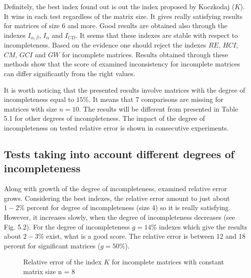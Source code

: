 Definitely, the best index found out is out the index proposed by Koczkodaj ($K$). It wins in each test regardless of the matrix size. It gives really satisfying results for matrices of size 6 and more. Good results are obtained also through the indexes $I_{\alpha,\beta}$, $I_{\alpha}$ and $I_{CD}$. It seems that these indexes are stable with respect to incompleteness. Based on the evidence one should reject the indexes $\textit{RE}$, $\textit{HCI}$, $\textit{CM}$, $\textit{GCI}$ and $\textit{GW}$ for incomplete matrices. Results obtained through these methods show that the score of examined inconsistency for incomplete matrices can differ significantly from the right values.

It is worth noticing that the presented results involve matrices with the degree of incompleteness equal to $15\%$. It means that 7 comparisons are missing for matrices with size $n = 10$. The results will be different from presented in Table 5.1 for other degrees of incompleteness. The impact of the degree of incompleteness on tested relative error is shown in consecutive experiments.

\subsection{Tests taking into account different degrees of incompleteness}
Along with growth of the degree of incompleteness, examined relative error grows. Considering the best indexes, the relative error amount to just about $1 - 2\%$ percent for degree of incompleteness (size 4) so it is really satisfying. However, it increases slowly, when the degree of incompleteness decreases (see Fig. 5.2). For the degree of incompleteness $g=14\%$ indexes which give the results about $2 - 3 \%$ exist, what is a good score. The relative error is between 12 and 18 percent for significant matrices ($g=50\%$).

\begin{figure}[]
  \begin{center}
\caption{Relative error of the index $K$ for incomplete matrices with constant matrix size n = 8}
\end{center}
\end{figure}

